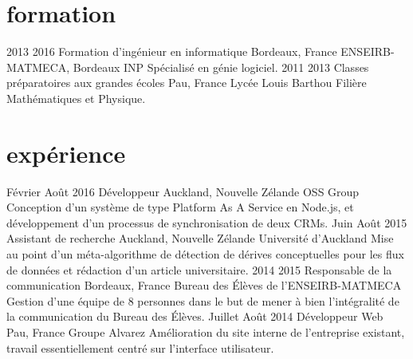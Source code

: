 \section{formation}
\begin{experiencelist}
\entry
    {2013}
    {2016}
    {Formation d'ingénieur en informatique}
    {Bordeaux, France}
    {ENSEIRB-MATMECA, Bordeaux INP}
    {
        Spécialisé en génie logiciel.
    }
\entry
    {2011}
    {2013}
    {Classes préparatoires aux grandes écoles}
    {Pau, France}
    {Lycée Louis Barthou}
    {
        Filière Mathématiques et Physique.
    }
\end{experiencelist}



\section{expérience}
\begin{experiencelist}
\entry
    {Février}
    {Août 2016}
    {Développeur}
    {Auckland, Nouvelle Zélande}
    {OSS Group}
    {
        Conception d'un système de type Platform As A Service en Node.js, et
        développement d'un processus de synchronisation de deux CRMs.
    }
\entry
    {Juin}
    {Août 2015}
    {Assistant de recherche}
    {Auckland, Nouvelle Zélande}
    {Université d'Auckland}
    {
        Mise au point d'un méta-algorithme de détection de dérives conceptuelles
        pour les flux de données et rédaction d'un article universitaire.
    }
\entry
    {2014}
    {2015}
    {Responsable de la communication}
    {Bordeaux, France}
    {Bureau des Élèves de l'ENSEIRB-MATMECA}
    {
        Gestion d'une équipe de 8 personnes dans le but de mener à bien
        l'intégralité de la communication du Bureau des Élèves.
    }
\entry
    {Juillet}
    {Août 2014}
    {Développeur Web}
    {Pau, France}
    {Groupe Alvarez}
    {
        Amélioration du site interne de l'entreprise existant, travail
        essentiellement centré sur l'interface utilisateur.
    }
\end{experiencelist}



